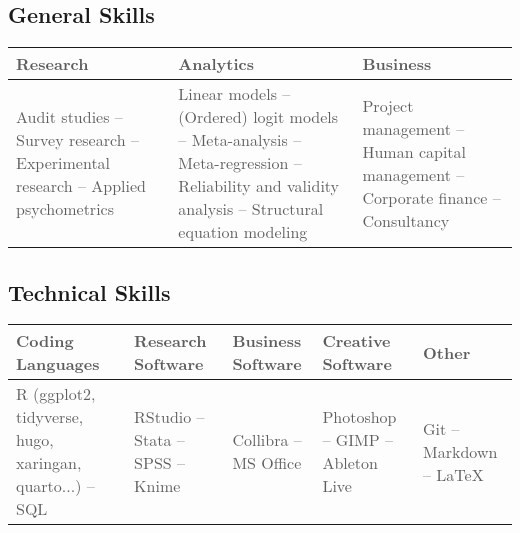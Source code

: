 \documentclass[11pt,a4paper,]{awesome-cv}
\begin{document}
\medskip

\hypertarget{general-skills}{%
\subsection{General Skills}\label{general-skills}}

\begin{table}[H]
\centering\begingroup\fontsize{9}{11}\selectfont

\begin{tabular}{>{\centering\arraybackslash}p{5.2cm}>{\centering\arraybackslash}p{5.2cm}>{\centering\arraybackslash}p{5.2cm}}
\toprule
\textcolor[HTML]{5d5d5d}{\textbf{Research}} & \textcolor[HTML]{5d5d5d}{\textbf{Analytics}} & \textcolor[HTML]{5d5d5d}{\textbf{Business}}\\
\midrule
\textcolor[HTML]{5d5d5d}{Audit studies -- Survey research -- Experimental research -- Applied psychometrics} & \textcolor[HTML]{5d5d5d}{Linear models -- (Ordered) logit models -- Meta-analysis -- Meta-regression -- Reliability and validity analysis -- Structural equation modeling} & \textcolor[HTML]{5d5d5d}{Project management -- Human capital management -- Corporate finance -- Consultancy}\\
\bottomrule
\end{tabular}
\endgroup{}
\end{table}

\hypertarget{technical-skills}{%
\subsection{Technical Skills}\label{technical-skills}}

\begin{table}[H]
\centering\begingroup\fontsize{9}{11}\selectfont

\begin{tabular}{>{\centering\arraybackslash}p{2.96cm}>{\centering\arraybackslash}p{2.96cm}>{\centering\arraybackslash}p{2.96cm}>{\centering\arraybackslash}p{2.96cm}>{\centering\arraybackslash}p{2.96cm}}
\toprule
\textcolor[HTML]{5d5d5d}{\textbf{Coding Languages}} & \textcolor[HTML]{5d5d5d}{\textbf{Research Software}} & \textcolor[HTML]{5d5d5d}{\textbf{Business Software}} & \textcolor[HTML]{5d5d5d}{\textbf{Creative Software}} & \textcolor[HTML]{5d5d5d}{\textbf{Other}}\\
\midrule
\textcolor[HTML]{5d5d5d}{R (ggplot2, tidyverse, hugo, xaringan, quarto...) -- SQL} & \textcolor[HTML]{5d5d5d}{RStudio -- Stata -- SPSS -- Knime} & \textcolor[HTML]{5d5d5d}{Collibra -- MS Office} & \textcolor[HTML]{5d5d5d}{Photoshop -- GIMP -- Ableton Live} & \textcolor[HTML]{5d5d5d}{Git -- Markdown -- LaTeX}\\
\bottomrule
\end{tabular}
\endgroup{}
\end{table}
\end{document}

